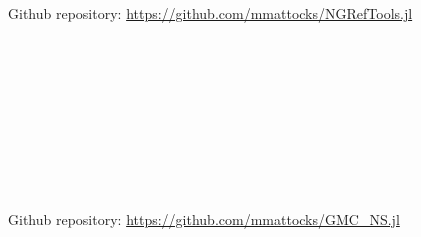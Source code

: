 \documentclass{ut-thesis}
\begin{document}
\begin{NoHyper}
\section{\protect{}}
Github repository: \url{https://github.com/mmattocks/NGRefTools.jl}
\label{NGRefTools}
\subsection{\protect{}}
\inputminted[breaklines, mathescape, linenos,   numbersep=5pt, frame=lines, framesep=2mm]{julia}{/srv/git/NGRefTools/src/LogNormalUtils.jl}
\subsection{\protect{}}
\inputminted[breaklines, mathescape, linenos,   numbersep=5pt, frame=lines, framesep=2mm]{julia}{/srv/git/NGRefTools/src/MarginalTDist.jl}
\subsection{\protect{}}
\inputminted[breaklines, mathescape, linenos,   numbersep=5pt, frame=lines, framesep=2mm]{julia}{/srv/git/NGRefTools/src/NGRef.jl}
\subsection{\protect{}}
\inputminted[breaklines, mathescape, linenos,   numbersep=5pt, frame=lines, framesep=2mm]{julia}{/srv/git/NGRefTools/src/NGRefTools.jl}
\subsection{\protect{}}
\inputminted[breaklines, mathescape, linenos,   numbersep=5pt, frame=lines, framesep=2mm]{julia}{/srv/git/NGRefTools/src/NIGRef.jl}

\section{\protect{}}
Github repository: \url{https://github.com/mmattocks/GMC_NS.jl}
\label{GMCNScode}
\subsection{\protect{}}
\inputminted[breaklines, mathescape, linenos,   numbersep=5pt, frame=lines, framesep=2mm]{julia}{/srv/git/GMC_NS/src/GMC_NS.jl}

\end{NoHyper}
\end{document}
